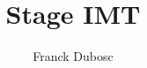 \title { Stage IMT }
\author{ Franck Dubosc }
\def\businessTutor{ PAUL Allen }
\def\schoolTutor{ Tony Soprano }